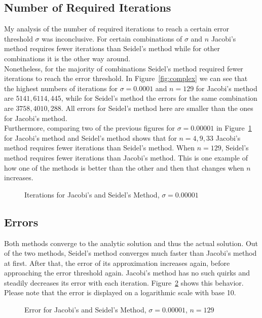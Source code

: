 \documentclass[a4paper,12pt,reqno]{article}
\newcommand{\figref}[1]{Figure~\ref{#1}}
\begin{document}
\subsection{Number of Required Iterations}

My analysis of the number of required iterations to reach a certain error
threshold $\sigma$ was inconclusive. For certain combinations of $\sigma$ and
$n$ Jacobi's method requires fewer iterations than Seidel's method while for
other combinations it is the other way around.\\
Nonetheless, for the majority of combinations Seidel's method required fewer
iterations to reach the error threshold. In \figref{fig:complex} we can see
that the highest numbers of iterations for $\sigma=0.0001$ and $n=129$ for 
Jacobi's method are $5141, 6114, 445$, while for Seidel's method the errors for 
the same combination are $3758, 4010, 288$. All errors for Seidel's method here 
are smaller than the ones for Jacobi's method.\\
Furthermore, comparing two of the previous figures for $\sigma=0.00001$ in
\figref{fig:its} for Jacobi's method and Seidel's method shows that for
$n=4,9,33$ Jacobi's method requires fewer iterations than Seidel's method. When
$n=129$, Seidel's method requires fewer iterations than Jacobi's method. This
is one example of how one of the methods is better than the other and then that
changes when $n$ increases.
\begin{figure}[H]
    \center
    \caption{Iterations for Jacobi's and Seidel's Method, $\sigma=0.00001$}
    \label{fig:its}
\end{figure}

\subsection{Errors}

Both methods converge to the analytic solution and thus the actual solution.
Out of the two methods, Seidel's method converges much faster than Jacobi's
method at first. After that, the error of its approximation increases again,
before approaching the error threshold again. Jacobi's method has no such
quirks and steadily decreases its error with each iteration. \figref{fig:err}
shows this behavior. Please note that the error is displayed on a logarithmic
scale with base 10.
\begin{figure}[H]
    \center
    \caption{Error for Jacobi's and Seidel's Method, $\sigma=0.00001$, $n=129$}
    \label{fig:err}
\end{figure}
\end{document}
